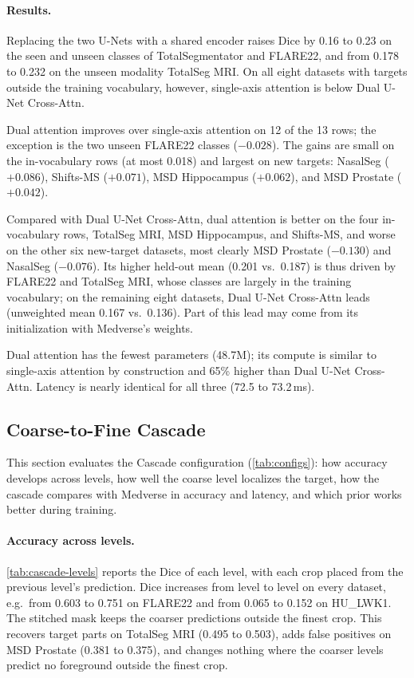 \documentclass[hidelinks, a4paper, 12pt, ngerman, english]{article}  %
\begin{document}
\paragraph{Results.}
Replacing the two U-Nets with a shared encoder raises Dice by 0.16 to 0.23 on
the seen and unseen classes of TotalSegmentator and FLARE22, and from 0.178 to
0.232 on the unseen modality TotalSeg MRI. On all eight datasets with targets
outside the training vocabulary, however, single-axis attention is below Dual
U-Net Cross-Attn.

Dual attention improves over single-axis attention on 12 of the 13 rows; the
exception is the two unseen FLARE22 classes ($-0.028$). The gains are small on
the in-vocabulary rows (at most 0.018) and largest on new targets: NasalSeg
($+0.086$), Shifts-MS ($+0.071$), MSD Hippocampus ($+0.062$), and MSD Prostate
($+0.042$).

Compared with Dual U-Net Cross-Attn, dual attention is better on the four
in-vocabulary rows, TotalSeg MRI, MSD Hippocampus, and Shifts-MS, and worse on
the other six new-target datasets, most clearly MSD Prostate ($-0.130$) and
NasalSeg ($-0.076$). Its higher held-out mean (0.201 vs.\ 0.187) is thus
driven by FLARE22 and TotalSeg MRI, whose classes are largely in the training
vocabulary; on the remaining eight datasets, Dual U-Net Cross-Attn leads
(unweighted mean 0.167 vs.\ 0.136). Part of this lead may come from its
initialization with Medverse's weights.

Dual attention has the fewest parameters (48.7M); its compute is similar to
single-axis attention by construction and 65\% higher than Dual U-Net
Cross-Attn. Latency is nearly identical for all three (72.5 to 73.2\,ms).%
\subsection{Coarse-to-Fine Cascade}\label{sec:results-cascade}

This section evaluates the Cascade configuration (\autoref{tab:configs}): how
accuracy develops across levels, how well the coarse level localizes the
target, how the cascade compares with Medverse in accuracy and latency, and
which prior works better during training.

\paragraph{Accuracy across levels.}
\autoref{tab:cascade-levels} reports the Dice of each level, with each crop
placed from the previous level's prediction. Dice increases from level to
level on every dataset, e.g.\ from 0.603 to 0.751 on FLARE22 and from 0.065
to 0.152 on HU\_LWK1. The stitched mask keeps the coarser predictions outside
the finest crop. This recovers target parts on TotalSeg MRI (0.495 to 0.503),
adds false positives on MSD Prostate (0.381 to 0.375), and changes nothing
where the coarser levels predict no foreground outside the finest crop.
\end{document}
